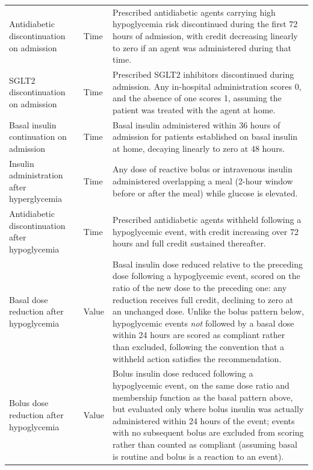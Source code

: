 \documentclass[11pt,a4paper]{article}
\begin{document}
\begin{longtable}{
>{\raggedright\arraybackslash}p{}
>{\centering\arraybackslash}p{}
>{\raggedright\arraybackslash}p{}
}
Antidiabetic discontinuation on admission & Time &
Prescribed antidiabetic agents carrying high hypoglycemia risk discontinued
during the first 72 hours of admission, with credit decreasing linearly to zero
if an agent was administered during that time. \\

SGLT2 discontinuation on admission & Time &
Prescribed SGLT2 inhibitors discontinued during admission. Any in-hospital
administration scores 0, and the absence of one scores 1, assuming the
patient was treated with the agent at home. \\

Basal insulin continuation on admission & Time &
Basal insulin administered within 36 hours of admission for patients
established on basal insulin at home, decaying linearly to zero at 48
hours. \\

Insulin administration after hyperglycemia & Time &
Any dose of reactive bolus or intravenous insulin administered overlapping a
meal (2-hour window before or after the meal) while glucose is elevated. \\

Antidiabetic discontinuation after hypoglycemia & Time &
Prescribed antidiabetic agents withheld following a hypoglycemic event, with
credit increasing over 72 hours and full credit sustained thereafter. \\

Basal dose reduction after hypoglycemia & Value &
Basal insulin dose reduced relative to the preceding dose following a
hypoglycemic event, scored on the ratio of the new dose to the preceding one:
any reduction receives full credit, declining to zero at an unchanged dose.
Unlike the bolus pattern below, hypoglycemic events \emph{not} followed by a
basal dose within 24 hours are scored as compliant rather than excluded,
following the convention that a withheld action satisfies the
recommendation. \\

Bolus dose reduction after hypoglycemia & Value &
Bolus insulin dose reduced following a hypoglycemic event, on the same dose
ratio and membership function as the basal pattern above, but evaluated only
where bolus insulin was actually administered within 24 hours of the event;
events with no subsequent bolus are excluded from scoring rather than
counted as compliant (assuming basal is routine and bolus is a reaction to
an event). \\


\end{longtable}
\end{document}
